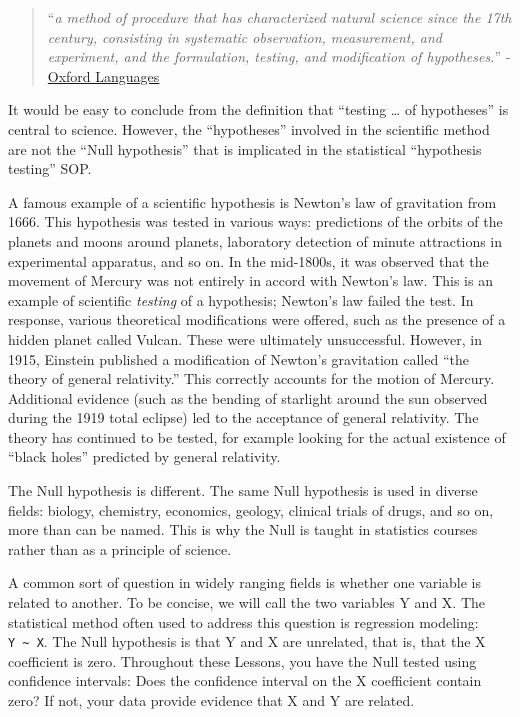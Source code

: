 \documentclass[
  letterpaper,
  DIV=11,
  numbers=noendperiod,
  oneside]{scrartcl}
\begin{document}
\begin{quote}
``\emph{a method of procedure that has characterized natural science
since the 17th century, consisting in systematic observation,
measurement, and experiment, and the formulation, testing, and
modification of hypotheses.}'' -
\href{https://www.google.com/search?sca_esv=602370719&rlz=1C5GCEM_enUS1006US1006&sxsrf=ACQVn0-Vp5HueSAjg05yXwP859Mw1Sk6ow:1706543263223&q=scientific+method&si=AKbGX_p2B8iBOZf_YfLS8bvEFIMJNs7y1MTrkI8v1uAaBR7ErDxx_KuXFDFrN3IRGYTANksg7RTBBfcxl7zo7PZgSexguZkhzaS_0plTHDg-uHUJdS7B1u0yU53iBW6crQUJ8LRQyesG&expnd=1&sa=X&sqi=2&ved=2ahUKEwiZ6_2H-YKEAxXQrokEHQVDCGYQ2v4IegQIDhAO&biw=1281&bih=857&dpr=2}{Oxford
Languages}
\end{quote}

It would be easy to conclude from the definition that ``testing \ldots{}
of hypotheses'' is central to science. However, the ``hypotheses''
involved in the scientific method are not the ``Null hypothesis'' that
is implicated in the statistical ``hypothesis testing'' SOP.

A famous example of a scientific hypothesis is Newton's law of
gravitation from 1666. This hypothesis was tested in various ways:
predictions of the orbits of the planets and moons around planets,
laboratory detection of minute attractions in experimental apparatus,
and so on. In the mid-1800s, it was observed that the movement of
Mercury was not entirely in accord with Newton's law. This is an example
of scientific \emph{testing} of a hypothesis; Newton's law failed the
test. In response, various theoretical modifications were offered, such
as the presence of a hidden planet called Vulcan. These were ultimately
unsuccessful. However, in 1915, Einstein published a modification of
Newton's gravitation called ``the theory of general relativity.'' This
correctly accounts for the motion of Mercury. Additional evidence (such
as the bending of starlight around the sun observed during the 1919
total eclipse) led to the acceptance of general relativity. The theory
has continued to be tested, for example looking for the actual existence
of ``black holes'' predicted by general relativity.

The Null hypothesis is different. The same Null hypothesis is used in
diverse fields: biology, chemistry, economics, geology, clinical trials
of drugs, and so on, more than can be named. This is why the Null is
taught in statistics courses rather than as a principle of science.

A common sort of question in widely ranging fields is whether one
variable is related to another. To be concise, we will call the two
variables Y and X. The statistical method often used to address this
question is regression modeling: \texttt{Y\ \textasciitilde{}\ X}. The
Null hypothesis is that Y and X are unrelated, that is, that the X
coefficient is zero. Throughout these Lessons, you have the Null tested
using confidence intervals: Does the confidence interval on the X
coefficient contain zero? If not, your data provide evidence that X and
Y are related.
\end{document}
